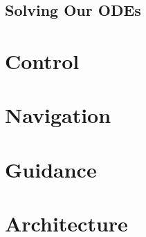 \documentclass{article}
\begin{document}
\subsection{Solving Our ODEs}


\clearpage
\section{Control}


\clearpage
\section{Navigation}


\clearpage
\section{Guidance}


\clearpage
\section{Architecture}

\end{document}
